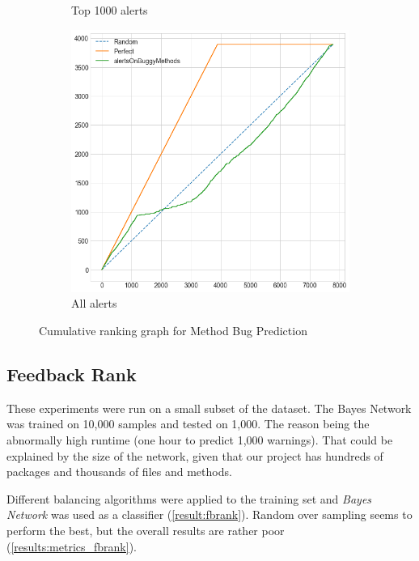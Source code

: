 \begin{figure}[H]
\begin{subfigure}{.5\textwidth}
		\caption{Top 1000 alerts}\label{}
	\end{subfigure}%
	\begin{subfigure}{.5\textwidth}
		\centering
		\includegraphics[scale=0.3]{./src/methodBug/methodbug_cumulative_graph_all.png}
		\caption{All alerts}\label{}
	\end{subfigure}
	\caption{Cumulative ranking graph for Method Bug Prediction}
	\label{results:cumulative_bugprediction}
\end{figure}

\subsection{Feedback Rank}

These experiments were run on a small subset of the dataset. The Bayes Network was trained on 10,000 samples and tested on 1,000. The reason being the abnormally high runtime (one hour to predict 1,000 warnings). That could be explained by the size of the network, given that our project has hundreds of packages and thousands of files and methods.

Different balancing algorithms were applied to the training set and \textit{Bayes Network} was used as a classifier (\cref{result:fbrank}). Random over sampling seems to perform the best, but the overall results are rather poor (\cref{results:metrics_fbrank}).

